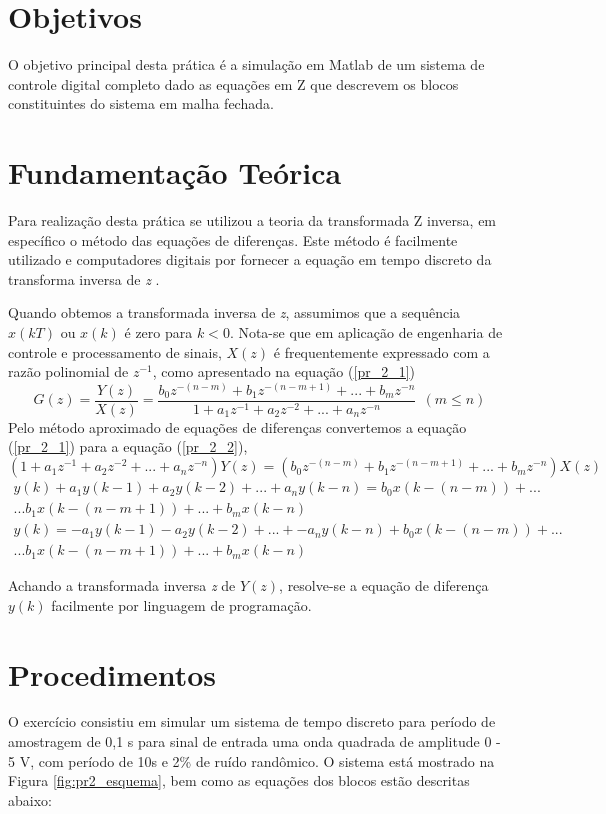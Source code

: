 \section{Objetivos}
 O objetivo principal desta prática é a simulação em Matlab de um sistema de controle digital completo dado as equações em Z que descrevem os blocos constituintes do sistema em malha fechada.

\section{Fundamentação Teórica}
Para realização desta prática se utilizou a teoria da transformada Z inversa, em específico o método das equações de diferenças. Este método é facilmente utilizado e computadores digitais por fornecer a equação em tempo discreto da transforma inversa de \textit{z} .

Quando obtemos a transformada inversa de \textit{z}, assumimos que a sequência $x(kT)$ ou $x(k)$ é zero para $k<0$. Nota-se que em aplicação de engenharia de controle e processamento de sinais, $X(z)$ é frequentemente expressado com a razão polinomial de $z^{-1 }$, como apresentado na equação (\ref{pr_2_1})
\begin{equation}
G(z) = \frac{Y(z)}{X(z)} = \frac{b_0z^{-(n-m)}+b_1z^{-(n-m+1)}+...+ b_mz^{-n}}{1 + a_1z^{-1} + a_2z^{-2} + ... + a_nz^{-n}} \ \   (m \leq n)
	\label{pr_2_1}
\end{equation} 
Pelo método aproximado de equações de diferenças convertemos a equação (\ref{pr_2_1}) para a equação (\ref{pr_2_2}),
$$
(1 + a_1z^{-1} + a_2z^{-2} + ... + a_nz^{-n})Y(z) = (b_0z^{-(n-m)}+b_1z^{-(n-m+1)}+...+ b_mz^{-n})X(z) 
$$
\begin{eqnarray}
y(k) + a_1y(k-1) + a_2y(k-2) + ... + a_ny(k-n) =  b_0x(k-(n-m)) + ... \nonumber \\ 
... b_1x(k-(n-m+1)) + ... + b_mx(k-n) \nonumber \\
y(k) = - a_1y(k-1) - a_2y(k-2) + ... + - a_ny(k-n) + b_0x(k-(n-m)) + ... \nonumber \\ 
... b_1x(k-(n-m+1)) + ... + b_mx(k-n)
\label{pr_2_2}
\end{eqnarray}

Achando a transformada inversa \textit{z} de $Y(z)$, resolve-se a equação de diferença $y(k)$ facilmente por linguagem de programação.


\section{Procedimentos}
O exercício consistiu em simular um sistema de tempo discreto para período de amostragem de 0,1 s para sinal de entrada uma onda quadrada de amplitude 0 - 5 V, com período de 10s e 2\% de ruído randômico. O sistema está mostrado na Figura \ref{fig:pr2_esquema}, bem como as equações dos blocos estão descritas abaixo:

